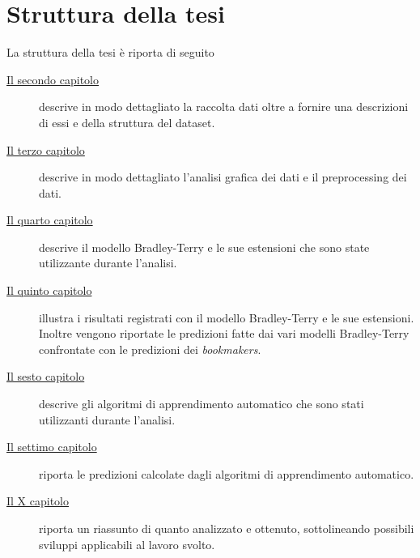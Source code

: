 \section{Struttura della tesi}
La struttura della tesi è riporta di seguito
\begin{description}

\item[{\hyperref[cap:dataset]{Il secondo capitolo}}] descrive in modo dettagliato la raccolta dati oltre a fornire una descrizioni di essi e della struttura del dataset. 
\item[{\hyperref[cap:Analisi]{Il terzo capitolo}}] descrive in modo dettagliato l'analisi grafica dei dati e il preprocessing dei dati. 
\item[{\hyperref[cap:BT]{Il quarto capitolo}}] descrive il modello Bradley-Terry e le sue estensioni che sono state utilizzante durante l'analisi.
\item[{\hyperref[cap:risultatiDM]{Il quinto capitolo}}] illustra i risultati registrati con il modello Bradley-Terry e le sue estensioni. Inoltre vengono riportate le predizioni fatte dai vari modelli Bradley-Terry confrontate con le predizioni dei \emph{bookmakers}.
\item[{\hyperref[cap:ML]{Il sesto capitolo}}] descrive gli algoritmi di apprendimento automatico che sono stati utilizzanti durante l'analisi.
\item[{\hyperref[cap:RisML]{Il settimo capitolo}}] riporta le predizioni calcolate dagli algoritmi di apprendimento automatico.
\item[{\hyperref[cap:conclusioni]{Il X capitolo}}] riporta un riassunto di quanto analizzato e ottenuto, sottolineando possibili sviluppi applicabili al lavoro svolto.
\end{description}





\begin{comment}
\begin{figure}[h]
	\begin{center}
		\texttt{[image: Logo\_azzurrodigite.png]}
		\caption{Logo di AzzurroDigitale}
	\end{center}
\end{figure}	contenuto...
\end{comment}






    
    
    

